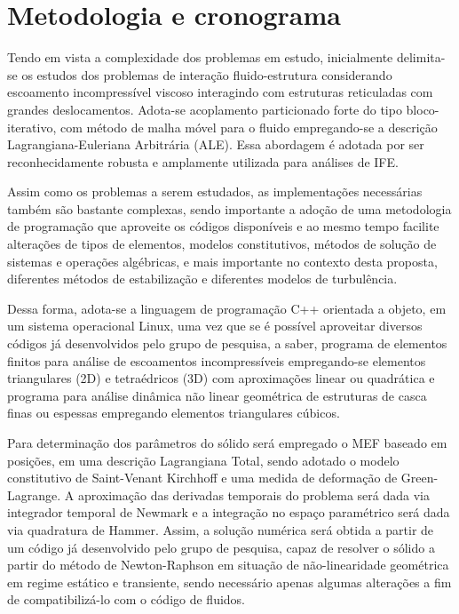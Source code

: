 \chapter{Metodologia e cronograma} \label{MetodologiaCronograma}

Tendo em vista a complexidade dos problemas em estudo, inicialmente delimita-se os estudos dos problemas de interação fluido-estrutura considerando escoamento incompressível viscoso interagindo com estruturas reticuladas com grandes deslocamentos. Adota-se acoplamento particionado forte do tipo bloco-iterativo, com método de malha móvel para o fluido empregando-se a descrição Lagrangiana-Euleriana Arbitrária (ALE). Essa abordagem é adotada por ser reconhecidamente robusta e amplamente utilizada para análises de IFE.

Assim como os problemas a serem estudados, as implementações necessárias também são bastante complexas, sendo importante a adoção de uma metodologia de programação que aproveite os códigos disponíveis e ao mesmo tempo facilite alterações de tipos de elementos, modelos constitutivos, métodos de solução de sistemas e operações algébricas, e mais importante no contexto desta proposta, diferentes métodos de estabilização e diferentes modelos de turbulência.

Dessa forma, adota-se a linguagem de programação C++ orientada a objeto, em um sistema operacional Linux, uma vez que se é possível aproveitar diversos códigos já desenvolvidos pelo grupo de pesquisa, a saber, programa de elementos finitos para análise de escoamentos incompressíveis empregando-se elementos triangulares (2D) e tetraédricos (3D) com aproximações linear ou quadrática e programa para análise dinâmica não linear geométrica de estruturas de casca finas ou espessas empregando elementos triangulares cúbicos.

Para determinação dos parâmetros do sólido será empregado o MEF baseado em posições, em uma descrição Lagrangiana Total, sendo adotado o modelo constitutivo de Saint-Venant Kirchhoff e uma medida de deformação de Green-Lagrange. A aproximação das derivadas temporais do problema será dada via integrador temporal de Newmark e a integração no espaço paramétrico será dada via quadratura de Hammer. Assim, a solução numérica será obtida a partir de um código já desenvolvido pelo grupo de pesquisa, capaz de resolver o sólido a partir do método de Newton-Raphson em situação de não-linearidade geométrica em regime estático e transiente, sendo necessário apenas algumas alterações a fim de compatibilizá-lo com o código de fluidos.


